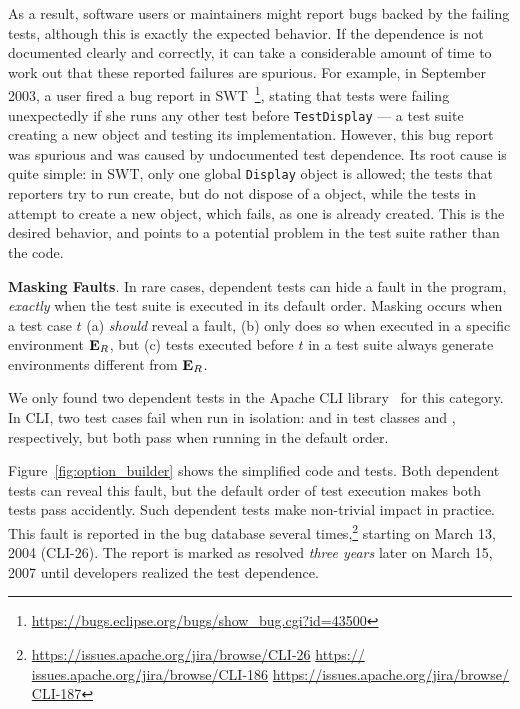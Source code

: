 As a result, software users or maintainers
might report bugs backed by the failing tests, although this
is exactly the expected behavior. 
If the dependence is not documented clearly and
correctly, it can take a considerable amount of time to work out that
these reported failures are spurious.
For example,
in September 2003, a user fired a
bug report in SWT~\cite{swt}\footnote{\url{https://bugs.eclipse.org/bugs/show_bug.cgi?id=43500}},
stating that tests were failing unexpectedly
if she runs any other test before \texttt{TestDisplay} --- 
a test suite creating a new  object and testing its
implementation. However, this bug report was spurious and was
caused by undocumented test dependence.
Its root cause is quite simple: in SWT, only one global \texttt{Display}
object is allowed; the tests that reporters try to run
create, but do not dispose of a  object, while
the tests in  attempt to create
a new  object, which fails, as one
is already created. This is the desired behavior,
and points to a potential problem in the test suite rather
than the code.

\vspace{1mm}

\noindent \textbf{Masking Faults}. In rare cases,
dependent tests can hide a fault in the
program, \emph{exactly} when the test suite is executed in its default
order. Masking occurs when a test case $t$ (a) \emph{should}
reveal a fault, (b) only does so when executed in a specific environment
$\mathbf{E}_R$, but (c) tests executed before $t$ in a test suite always
generate environments different from
$\mathbf{E}_R$.



We only found two dependent tests in
the Apache CLI library~\cite{cli} for this category.
In CLI, two test cases fail when run in isolation:
 and  in test
classes  and ,
respectively, but both pass when running in the default order.

Figure~\ref{fig:option_builder} shows the simplified code and
tests. Both dependent tests can reveal this fault,  but
the default order of test execution makes both tests pass
accidently. Such dependent tests
make non-trivial impact in practice.
This fault is reported in the bug
database several times,\footnote{\url{https://issues.apache.org/jira/browse/CLI-26} \url{https://
issues.apache.org/jira/browse/CLI-186} \url{https://issues.apache.org/jira/browse/
CLI-187}} starting on March 13, 2004 (CLI-26). The report is marked as resolved
\emph{three years} later on March 15, 2007 until developers
realized the test dependence.

